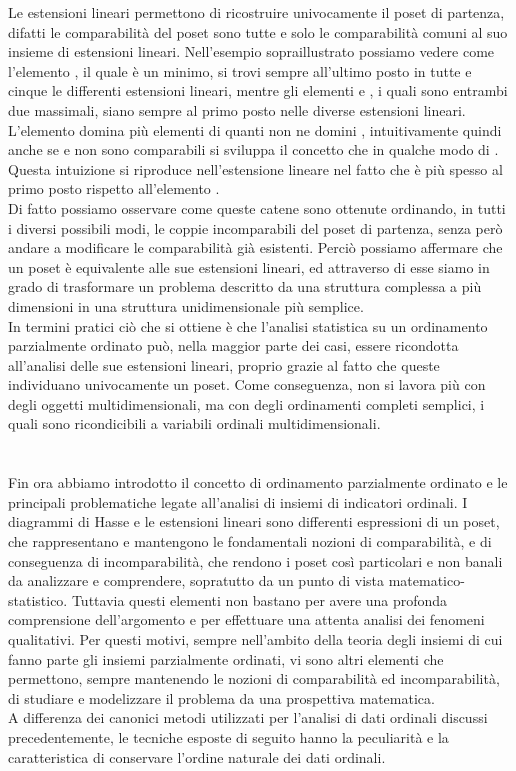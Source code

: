 \documentclass[a4paper,12pt, openright]{report}
\begin{document}
Le estensioni lineari permettono di ricostruire univocamente il poset di partenza, difatti le comparabilità del poset sono tutte e solo le 
comparabilità comuni al suo insieme di estensioni lineari. Nell'esempio sopraillustrato possiamo vedere come l'elemento , il quale è un minimo, si trovi
sempre all'ultimo posto in tutte e cinque le differenti estensioni lineari, mentre gli elementi  e , i quali sono entrambi due
massimali, siano sempre al primo posto nelle diverse estensioni lineari. L'elemento  domina più elementi di quanti non ne domini 
, intuitivamente quindi anche se  e  non sono comparabili si sviluppa il concetto che   in qualche modo
di . Questa intuizione si riproduce nell'estensione lineare nel fatto che  è più spesso al primo posto rispetto all'elemento . \\
Di fatto possiamo osservare come queste catene sono ottenute ordinando, in tutti i diversi possibili modi, le coppie incomparabili del poset
di partenza, senza però andare a modificare le comparabilità già esistenti.
Perciò possiamo affermare che un poset è equivalente alle sue estensioni
lineari, ed attraverso di esse siamo in grado di trasformare un problema descritto da una struttura complessa a più dimensioni in una
struttura unidimensionale più semplice. \\
In termini pratici ciò che si ottiene è che l'analisi statistica su un ordinamento parzialmente ordinato può, nella maggior parte dei casi,
essere ricondotta all'analisi delle sue estensioni lineari, proprio grazie al fatto che queste individuano univocamente un poset. Come conseguenza, non si 
lavora più con degli oggetti multidimensionali, ma con degli ordinamenti completi semplici, i quali sono ricondicibili a variabili ordinali
multidimensionali. \\
\\
\\
Fin ora abbiamo introdotto il concetto di ordinamento parzialmente ordinato e le principali problematiche legate all'analisi di insiemi
di indicatori ordinali. I diagrammi di Hasse e le estensioni lineari sono differenti espressioni di un poset, che rappresentano e mantengono le 
fondamentali nozioni di comparabilità,  e di conseguenza di incomparabilità, che rendono i poset così particolari e non banali da analizzare e 
comprendere, sopratutto da un punto di vista matematico-statistico. Tuttavia questi elementi non bastano per avere una profonda comprensione
dell'argomento e
per effettuare una attenta analisi dei fenomeni qualitativi. Per questi motivi, sempre nell'ambito della teoria degli insiemi di cui fanno 
parte gli insiemi parzialmente ordinati, vi sono altri elementi che permettono, sempre mantenendo le nozioni di comparabilità ed incomparabilità,
di studiare e modelizzare il problema da una prospettiva matematica. \\
A differenza dei canonici metodi utilizzati per l'analisi di dati ordinali discussi precedentemente, le tecniche esposte di seguito hanno 
la peculiarità e la caratteristica di conservare l'ordine naturale dei dati ordinali. \\
\end{document}
